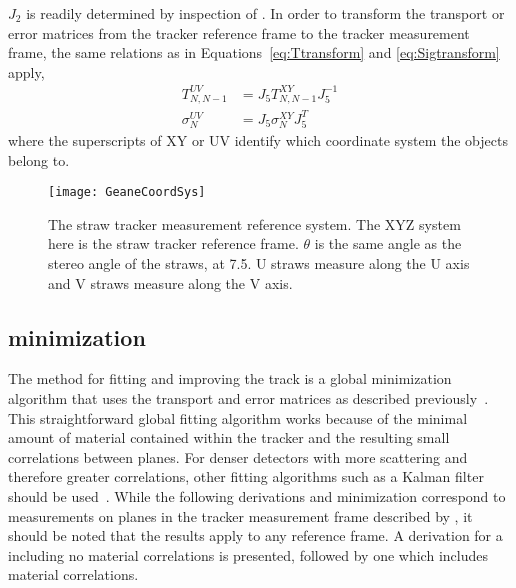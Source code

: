 $J_{2}$ is readily determined by inspection of . In order to transform the transport or error matrices from the tracker reference frame to the tracker measurement frame, the same relations as in Equations~\ref{eq:Ttransform} and \ref{eq:Sigtransform} apply,
    \begin{align}
        T_{N,N-1}^{UV} &= J_{5} T_{N,N-1}^{XY} J_{5}^{-1} \\
        \sigma_{N}^{UV} &= J_{5} \sigma_{N}^{XY} J_{5}^{T}
    \end{align}
where the superscripts of XY or UV identify which coordinate system the objects belong to.

\begin{figure}
  \centering
  \texttt{[image: GeaneCoordSys]}
    \caption[Natural tracker measurement system]{The straw tracker measurement reference system. The XYZ system here is the straw tracker reference frame. $\theta$ is the same angle as the stereo angle of the straws, at 7.5\textdegree{}. U straws measure along the U axis and V straws measure along the V axis.}
    \label{fig:GeaneCoordSys}
\end{figure}




\subsection{\texorpdfstring{\chisq}{chisq} minimization}
\label{sec:TrackFittingAlgorithm}


The method for fitting and improving the track is a global \chisq minimization algorithm that uses the transport and error matrices as described previously~\cite{geanemanual,trajfit}. This straightforward global fitting algorithm works because of the minimal amount of material contained within the tracker and the resulting small correlations between planes. For denser detectors with more scattering and therefore greater correlations, other fitting algorithms such as a Kalman filter should be used~\cite{Lavezzi}. While the following derivations and minimization correspond to measurements on planes in the tracker measurement frame described by , it should be noted that the results apply to any reference frame. A derivation for a \chisq including no material correlations is presented, followed by one which includes material correlations. 

